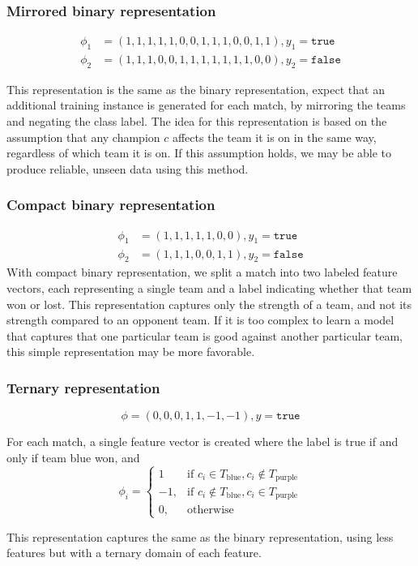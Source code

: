 \subsubsection{Mirrored binary representation}

\begin{align*}
  \phi_1 &= (1,1,1,1,1,0,0,1,1,1,0,0,1,1), y_1 = \texttt{true}\\
  \phi_2 &= (1,1,1,0,0,1,1,1,1,1,1,1,0,0), y_2 = \texttt{false}
\end{align*}

This representation is the same as the binary representation, expect that an additional training instance is generated for each match, by mirroring the teams and negating the class label.
The idea for this representation is based on the assumption that any champion $c$ affects the team it is on in the same way, regardless of which team it is on.
If this assumption holds, we may be able to produce reliable, unseen data using this method.

\subsubsection{Compact binary representation}
\begin{align*}
  \phi_1 &= (1,1,1,1,1,0,0), y_1 = \texttt{true} \\
  \phi_2 &= (1,1,1,0,0,1,1), y_2 =\texttt{false}
\end{align*}
With compact binary representation, we split a match into two labeled feature vectors, each representing a single team and a label indicating whether that team won or lost.
This representation captures only the strength of a team, and not its strength compared to an opponent team.
If it is too complex to learn a model that captures that one particular team is good against another particular team, this simple representation may be more favorable.

\subsubsection{Ternary representation}

\[\phi = (0,0,0,1,1,-1,-1), y = \texttt{true}\]

For each match, a single feature vector is created where the label is true if and only if team blue won, and
\[
    \phi_i = 
\begin{cases}
    1 				 & \text{if } c_i \in T_\text{blue}, c_i \not\in T_\text{purple}\\
    -1,              & \text{if } c_i \not\in T_\text{blue}, c_i \in T_\text{purple}\\
    0,              & \text{otherwise}
\end{cases}
\]

This representation captures the same as the binary representation, using less features but with a ternary domain of each feature.


